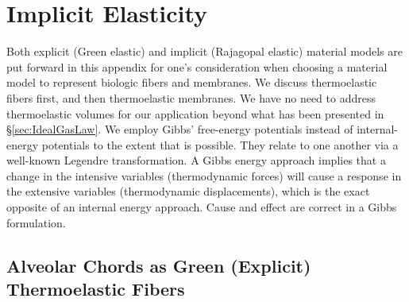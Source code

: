 \section{Implicit Elasticity}
\label{appImplicitElasticity}

Both explicit (Green \cite{Green41} elastic) and implicit (Rajagopal \cite{Rajagopal03} elastic) material models are put forward in this appendix for one's consideration when choosing a material model to represent biologic fibers and membranes.  We discuss thermo\-elastic fibers first, and then thermo\-elastic membranes.  We have no need to address thermo\-elastic volumes for our application beyond what has been presented in \S\ref{sec:IdealGasLaw}.  We employ Gibbs' free-energy potentials instead of internal-energy potentials to the extent that is possible.  They relate to one another via a well-known Legendre transformation.  A Gibbs energy approach implies that a change in the intensive variables (thermo\-dynamic forces) will cause a response in the extensive variables (thermo\-dynamic displacements), which is the exact opposite of an internal energy approach.  Cause and effect are correct in a Gibbs formulation.

\subsection{Alveolar Chords as Green (Explicit) Thermoelastic Fibers}

